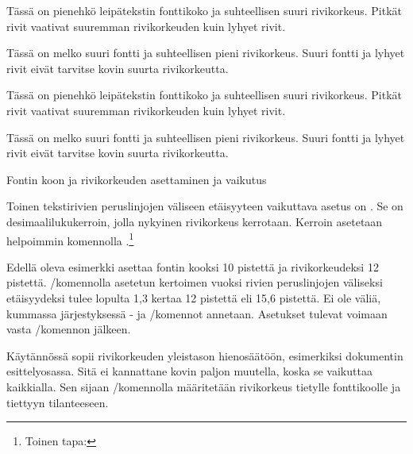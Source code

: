 \begin{esimerkki*}
\begin{koodilohko}
  \fontsize{8bp}{11bp}\selectfont Tässä on pienehkö leipätekstin
  fonttikoko ja suhteellisen suuri rivikorkeus. Pitkät rivit vaativat
  suuremman rivikorkeuden kuin lyhyet rivit.

  \fontsize{16bp}{17bp}\selectfont Tässä on melko suuri fontti ja
  suhteellisen pieni rivikorkeus. Suuri fontti ja lyhyet rivit eivät
  tarvitse kovin suurta rivikorkeutta.
\end{koodilohko}
\parbox{\linewidth}{%
  \linespread{1}
  \fontsize{8bp}{11bp}\selectfont Tässä on pienehkö leipätekstin
  fonttikoko ja suhteellisen suuri rivikorkeus. Pitkät rivit vaativat
  suuremman rivikorkeuden kuin lyhyet rivit.

  \fontsize{16bp}{17bp}\selectfont Tässä on melko suuri fontti ja
  suhteellisen pieni rivikorkeus. Suuri fontti ja lyhyet rivit eivät
  tarvitse kovin suurta rivikorkeutta. }

\vspace{1ex}
\hrulefill
\vspace{2ex}

\caption{Fontin koon ja rivikorkeuden asettaminen ja vaikutus}
\label{esim:rivikorkeus}
\end{esimerkki*}

Toinen tekstirivien peruslinjojen väliseen etäisyyteen vaikuttava asetus
on . Se on desimaalilukukerroin, jolla
nykyinen rivikorkeus kerrotaan. Kerroin asetetaan helpoimmin komennolla
.\footnote{Toinen tapa: }

\begin{koodilohkosis}
  \fontsize{10bp}{12bp} \linespread{1.3} \selectfont
\end{koodilohkosis}

Edellä oleva esimerkki asettaa fontin kooksi 10 pistettä ja
rivikorkeudeksi 12 pistettä. \-/komennolla
asetetun kertoimen vuoksi rivien peruslinjojen väliseksi etäisyydeksi
tulee lopulta 1,3 kertaa 12 pistettä eli 15,6 pistettä. Ei ole väliä,
kummassa järjestyksessä - ja \-/komennot annetaan. Asetukset tulevat voimaan vasta
\-/komennon jälkeen.

Käytännössä  sopii rivikorkeuden yleistason
hienosäätöön, esimerkiksi dokumentin esittelyosassa. Sitä ei kannattane
kovin paljon muutella, koska se vaikuttaa kaikkialla. Sen sijaan
\-/komennolla määritetään rivikorkeus tietylle
fonttikoolle ja tiettyyn tilanteeseen.

